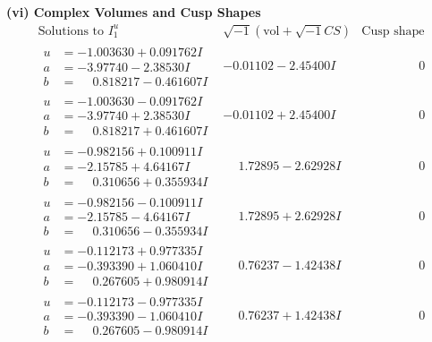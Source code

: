 \documentclass[1p]{elsarticle_modified}
\theoremstyle{definition}
\newcommand{\I}{\sqrt{-1}}
\begin{document}
\newpage\flushleft \textbf{(vi) Complex Volumes and Cusp Shapes}
$$\begin{array}{c|c|c}  
\text{Solutions to }I^u_{1}& \I (\text{vol} + \sqrt{-1}CS) & \text{Cusp shape}\\
 \hline 
\begin{aligned}
u &= -1.003630 + 0.091762 I \\
a &= -3.97740 - 2.38530 I \\
b &= \phantom{-}0.818217 - 0.461607 I\end{aligned}
 & -0.01102 - 2.45400 I & \phantom{-0.000000 } 0 \\ \hline\begin{aligned}
u &= -1.003630 - 0.091762 I \\
a &= -3.97740 + 2.38530 I \\
b &= \phantom{-}0.818217 + 0.461607 I\end{aligned}
 & -0.01102 + 2.45400 I & \phantom{-0.000000 } 0 \\ \hline\begin{aligned}
u &= -0.982156 + 0.100911 I \\
a &= -2.15785 + 4.64167 I \\
b &= \phantom{-}0.310656 + 0.355934 I\end{aligned}
 & \phantom{-}1.72895 - 2.62928 I & \phantom{-0.000000 } 0 \\ \hline\begin{aligned}
u &= -0.982156 - 0.100911 I \\
a &= -2.15785 - 4.64167 I \\
b &= \phantom{-}0.310656 - 0.355934 I\end{aligned}
 & \phantom{-}1.72895 + 2.62928 I & \phantom{-0.000000 } 0 \\ \hline\begin{aligned}
u &= -0.112173 + 0.977335 I \\
a &= -0.393390 + 1.060410 I \\
b &= \phantom{-}0.267605 + 0.980914 I\end{aligned}
 & \phantom{-}0.76237 - 1.42438 I & \phantom{-0.000000 } 0 \\ \hline\begin{aligned}
u &= -0.112173 - 0.977335 I \\
a &= -0.393390 - 1.060410 I \\
b &= \phantom{-}0.267605 - 0.980914 I\end{aligned}
 & \phantom{-}0.76237 + 1.42438 I & \phantom{-0.000000 } 0 \\ \hline\begin{aligned}

\end{aligned}
\end{array}$$
\end{document}

